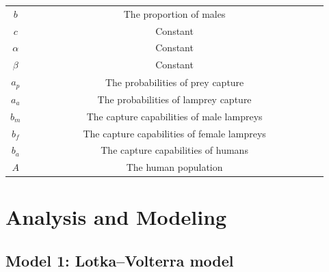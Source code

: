 \documentclass[CTeX = true]{mcmthesis}  %
\begin{document}
\begin{longtable}[hhhh]
\begin{tabular}{cccc}
  $b$  & ~~~~~~~~~ & The proportion of males & ~~~~~~~~~ \\
  $c$  & ~~~~~~~~~ & Constant & ~~~~~~~~~ \\
  $\alpha$  & ~~~~~~~~~ & Constant & ~~~~~~~~~ \\
  $\beta$  & ~~~~~~~~~ & Constant & ~~~~~~~~~ \\
  $a_p$  & ~~~~~~~~~ & The probabilities of prey capture & ~~~~~~~~~ \\
  $a_a$  & ~~~~~~~~~ & The probabilities of lamprey capture & ~~~~~~~~~ \\
  $b_m$  & ~~~~~~~~~ & The capture capabilities of male lampreys & ~~~~~~~~~ \\
  $b_f$  & ~~~~~~~~~ & The capture capabilities of female lampreys& ~~~~~~~~~ \\
  $b_a$  & ~~~~~~~~~ & The capture capabilities of humans & ~~~~~~~~~ \\
  $A$  & ~~~~~~~~~ & The human population & ~~~~~~~~~ \\
   \bottomrule
\end{tabular}
\end{longtable}

\section{Analysis and Modeling}
\subsection{Model 1: Lotka–Volterra model}

\end{document}
